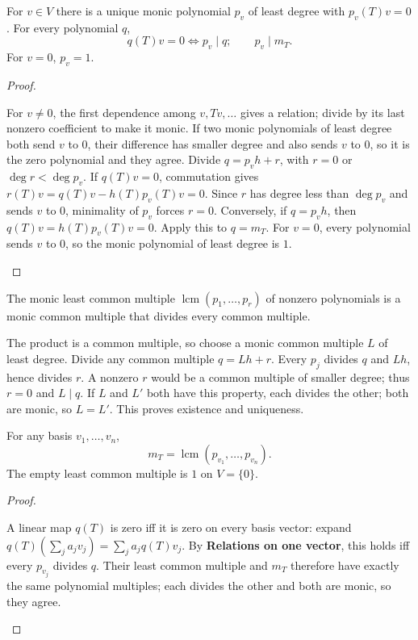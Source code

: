 \begin{proposition*}
For $v\in V$ there is a unique monic polynomial $p_v$ of least degree with $p_v(T)v=0$. For every polynomial $q$,
\[q(T)v=0\iff p_v\mid q;\qquad p_v\mid m_T.\]
For $v=0$, $p_v=1$.
\end{proposition*}
\begin{prob}\begin{proof}\begin{steps}
\ii For $v\ne0$, the first dependence among $v,Tv,\ldots$ gives a relation; divide by its last nonzero coefficient to make it monic. If two monic polynomials of least degree both send $v$ to $0$, their difference has smaller degree and also sends $v$ to $0$, so it is the zero polynomial and they agree.
\ii Divide $q=p_vh+r$, with $r=0$ or $\deg r<\deg p_v$. If $q(T)v=0$, commutation gives $r(T)v=q(T)v-h(T)p_v(T)v=0$. Since $r$ has degree less than $\deg p_v$ and sends $v$ to $0$, minimality of $p_v$ forces $r=0$. Conversely, if $q=p_vh$, then $q(T)v=h(T)p_v(T)v=0$.
\ii Apply this to $q=m_T$. For $v=0$, every polynomial sends $v$ to $0$, so the monic polynomial of least degree is $1$.
\end{steps}\end{proof}\end{prob}
\begin{prob}\begin{definition*}
The monic least common multiple $\operatorname{lcm}(p_1,\ldots,p_r)$ of nonzero polynomials is a monic common multiple that divides every common multiple.
\end{definition*}
\begin{steps}\ii The product is a common multiple, so choose a monic common multiple $L$ of least degree.
\ii Divide any common multiple $q=Lh+r$. Every $p_j$ divides $q$ and $Lh$, hence divides $r$. A nonzero $r$ would be a common multiple of smaller degree; thus $r=0$ and $L\mid q$.
\ii If $L$ and $L'$ both have this property, each divides the other; both are monic, so $L=L'$. This proves existence and uniqueness.
\end{steps}\end{prob}
\begin{proposition*}
For any basis $v_1,\ldots,v_n$,
\[m_T=\operatorname{lcm}(p_{v_1},\ldots,p_{v_n}).\]
The empty least common multiple is $1$ on $V=\{0\}$.
\end{proposition*}
\begin{prob}\begin{proof}\begin{steps}
\ii A linear map $q(T)$ is zero iff it is zero on every basis vector: expand $q(T)(\sum_j a_jv_j)=\sum_j a_jq(T)v_j$.
\ii By \textbf{Relations on one vector}, this holds iff every $p_{v_j}$ divides $q$. Their least common multiple and $m_T$ therefore have exactly the same polynomial multiples; each divides the other and both are monic, so they agree.
\end{steps}\end{proof}\end{prob}
